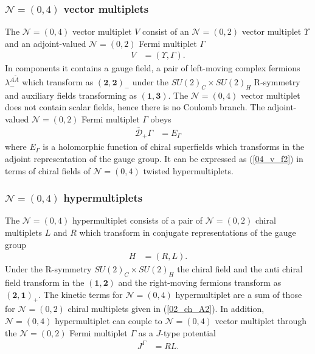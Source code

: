 \documentclass{article}
\numberwithin{equation}{section}
\begin{document}
\subsubsection{$\mathcal{N}=(0,4)$ vector multiplets}
The $\mathcal{N}=(0,4)$ vector multiplet $V$ consist of an $\mathcal{N}=(0,2)$ vector multiplet $\Upsilon$ 
and an adjoint-valued $\mathcal{N}=(0,2)$ Fermi multiplet $\Gamma$
\begin{align}
\label{04_v}
V&=(\Upsilon,\Gamma). 
\end{align}
In components it contains 
a gauge field, 
a pair of left-moving complex fermions $\lambda_{-}^{A\tilde{A}}$ 
which transform as $(\bm{2},\bm{2})_{-}$ under the $SU(2)_{C}\times SU(2)_{H}$ R-symmetry 
and auxiliary fields transforming as $(\bm{1}, \bm{3})$. 
The $\mathcal{N}=(0,4)$ vector multiplet does not contain scalar fields, hence there is no Coulomb branch. 
The adjoint-valued $\mathcal{N}=(0,2)$ Fermi multiplet $\Gamma$ obeys 
\begin{align}
\label{04_v_f1}
\overline{\mathcal{D}}_{+}\Gamma&=E_{\Gamma}
\end{align}
where $E_{\Gamma}$ is a holomorphic function of chiral superfields 
which transforms in the adjoint representation of the gauge group. 
It can be expressed as (\ref{04_v_f2}) in terms of chiral fields of $\mathcal{N}=(0,4)$ twisted hypermultiplets. 







\subsubsection{$\mathcal{N}=(0,4)$ hypermultiplets}
The $\mathcal{N}=(0,4)$ hypermultiplet consists of 
a pair of $\mathcal{N}=(0,2)$ chiral multiplets $L$ and $R$ which transform 
in conjugate representations of the gauge group
\begin{align}
\label{04_hm}
H&=(R,L). 
\end{align}
Under the R-symmetry $SU(2)_{C}\times SU(2)_{H}$ the chiral field and the anti chiral field transform in the $(\bm{1}, \bm{2})$ 
and the right-moving fermions transform as $(\bm{2},\bm{1})_{+}$. 
The kinetic terms for $\mathcal{N}=(0,4)$ hypermultiplet are 
a sum of those for $\mathcal{N}=(0,2)$ chiral multiplets given in (\ref{02_ch_A2}). 
In addition, $\mathcal{N}=(0,4)$ hypermultiplet can couple to $\mathcal{N}=(0,4)$ vector multiplet 
through the $\mathcal{N}=(0,2)$ Fermi multiplet $\Gamma$ as a $J$-type potential \cite{Tong:2014yna}
\begin{align}
\label{04h_coupling}
J^{\Gamma}&=RL. 
\end{align}
\end{document}
